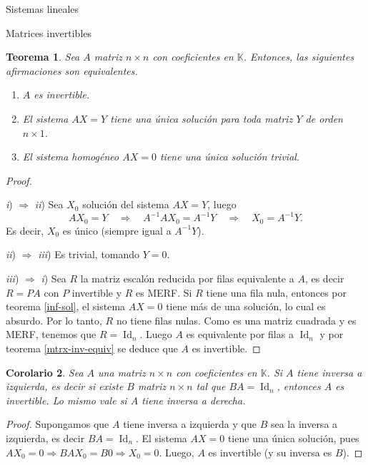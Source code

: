 \documentclass[a4paper,12pt,twoside,spanish,reqno]{amsbook}
\newtheorem{teorema}{Teorema}[section]
\newtheorem{corolario}[teorema]{Corolario}
\theoremstyle{definition}
\theoremstyle{remark}
\newcommand{\Id}{\operatorname{Id}}
\newcommand{\K}{\mathbb K}
\begin{document}
\begin{chapter}{Sistemas lineales}
\begin{section}{Matrices invertibles}
			
			\begin{teorema}\label{mtrx-inv-equiv2} 
				Sea $A$ matriz $n \times n$ con coeficientes en $\K$. Entonces,  las siguientes afirmaciones son equivalentes. 
				\begin{enumerate}
					\item[\textit{i})] $A$ es invertible.
					\item[\textit{ii})] El sistema $AX=Y$ tiene una única solución para toda matriz $Y$ de orden $n \times 1$. 
					\item[\textit{iii})] El sistema homogéneo $AX=0$ tiene una única solución trivial.
				\end{enumerate}
			\end{teorema}
			\begin{proof}
				
				\
				
				\textit{i}) $\Rightarrow$  \textit{ii}) Sea $X_0$ solución del sistema $AX=Y$, luego
				\begin{equation*}
				AX_0=Y  \quad \Rightarrow \quad  A^{-1}AX_0 = A^{-1}Y  \quad \Rightarrow \quad  X_0 = A^{-1}Y.
				\end{equation*}
				Es decir, $X_0$ es único (siempre igual  a $A^{-1}Y$).  
				
				
				\textit{ii}) $\Rightarrow$  \textit{iii}) Es trivial, tomando $Y =0$.
				
				
				
				\textit{iii}) $\Rightarrow$  \textit{i}) Sea $R$ la matriz escalón reducida por filas equivalente a $A$, es decir $R=PA$ con $P$ invertible y $R$ es MERF. Si $R$ tiene una fila nula, entonces por teorema \ref{inf-sol},  el sistema $AX =0$ tiene más de una solución, lo cual es absurdo.  Por lo tanto, $R$ no tiene filas nulas. Como es una matriz cuadrada y es MERF, tenemos que $R=\Id_n$. Luego $A$ es equivalente por filas a $\Id_n$ y por teorema \ref{mtrx-inv-equiv} se deduce que $A$ es invertible. 			
				
			\end{proof}
			
			\begin{corolario}
				Sea $A$ una matriz $n \times n$ con coeficientes  en $\K$. Si $A$ tiene inversa a izquierda,  es decir si existe $B$ matriz $n \times n$ tal que $BA=\Id_n$,   entonces $A$ es invertible.  Lo mismo vale si $A$ tiene inversa a derecha. 
			\end{corolario}	
			\begin{proof}
				Supongamos que  $A$ tiene inversa a izquierda y  que $B$ sea la inversa a izquierda,  es decir $BA=\Id_n$. El sistema $AX=0$ tiene una única solución, pues $AX_0=0 \Rightarrow BAX_0=B0 \Rightarrow X_0=0$. Luego, $A$  es invertible (y su inversa es $B$). 
				

\end{proof}
\end{section}
\end{chapter}
\end{document}
